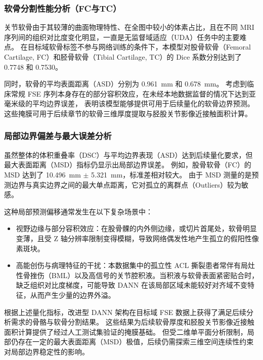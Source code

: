     \subsubsection{软骨分割性能分析（FC与TC）}
      关节软骨由于其较薄的曲面物理特性、在全图中较小的体素占比，且在不同 MRI 序列间的组织对比度变化明显，一直是无监督域适应（UDA）任务中的主要难点。
      在目标域软骨标签不参与网络训练的条件下，本模型对股骨软骨（Femoral Cartilage, FC）和胫骨软骨（Tibial Cartilage, TC）的 Dice 系数分别达到了 \num{0.7748} 和 \num{0.7530}。
      \par 同时，软骨的平均表面距离（ASD）分别为 \qty{0.961}{\milli\metre} 和 \qty{0.678}{\milli\metre}。
      考虑到临床常规 FSE 序列本身存在的部分容积效应，在未经本地数据监督的情况下达到亚毫米级的平均边界误差，
      表明该模型能够提供可用于后续量化的软骨边界预测。
      这些掩膜可用于后续章节的软骨三维厚度提取与胫股关节影像近接触面积计算。
    \subsubsection{局部边界偏差与最大误差分析}
      虽然整体的体积重叠率（DSC）与平均边界表现（ASD）达到后续量化要求，但最大表面距离（MSD）指标仍显示出局部边界误差。
      例如，股骨软骨（FC）的 MSD 达到了 \qty{10.496}{\milli\metre} $\pm$ \qty{5.321}{\milli\metre}，标准差相对较大。
      由于 MSD 测量的是预测边界与真实边界之间的最大单点距离，它对孤立的离群点（Outliers）较为敏感。
      \par 这种局部预测偏移通常发生在以下复杂场景中：
      \begin{itemize}
        \item 视野边缘与部分容积效应：在股骨髁的内外侧边缘，或切片首尾处，软骨明显变薄，且受 Z 轴分辨率限制变得模糊，导致网络偶发性地产生孤立的假阳性像素斑块。
        \item 高能创伤与病理特征的干扰：本数据集中的孤立性 ACL 撕裂患者常伴有局灶性骨挫伤（BML）以及高信号的关节腔积液。当积液与软骨表面紧密贴合时，缺乏组织对比度梯度，可能导致 DANN 在该局部区域未能较好对齐域不变特征，从而产生少量的边界外溢。
      \end{itemize}
      \par 根据上述量化指标，改进型 DANN 架构在目标域 FSE 数据上获得了满足后续分析需求的骨骼与软骨分割结果。
      这些结果为后续软骨厚度和胫股关节影像近接触面积计算提供了经过人工测试集验证的掩膜基础。
      但受二维单平面分析限制，局部仍存在一定的最大表面距离（MSD）极值，后续仍需探索三维空间连续性约束对局部边界稳定性的影响。
